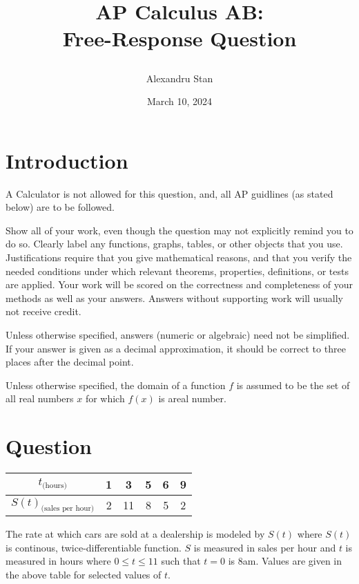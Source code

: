 \documentclass{article}
\title{
    \textbf{AP Calculus AB: \\Free-Response Question}
    \author{Alexandru Stan}
    \date{March 10, 2024}
}
\begin{document}
    \maketitle
    \vfill
    \newpage

    \section*{Introduction}

    A Calculator is not allowed for this question, and, all AP guidlines (as stated below) 
    are to be followed. 

    Show all of your work, even though the question may not explicitly remind you to do so. Clearly label any
    functions, graphs, tables, or other objects that you use. Justifications require that you give mathematical reasons,
    and that you verify the needed conditions under which relevant theorems, properties, definitions, or tests are
    applied. Your work will be scored on the correctness and completeness of your methods as well as your answers.
    Answers without supporting work will usually not receive credit.

    Unless otherwise specified, answers (numeric or algebraic) need not be simplified. If your answer is given as a
    decimal approximation, it should be correct to three places after the decimal point.

    Unless otherwise specified, the domain of a function $f$ is assumed to be the set of all real numbers $x$ for which
    $f(x)$ is areal number.

    \section*{Question}

    \begin{table}[h]
        \def\arraystretch{2}
        \begin{tabular}{|c|c|c|c|c|c|}
            \hline
            $t_{\text{(hours)}}$ & 1 & 3 & 5 & 6 & 9 \\
            \hline
            $S(t)_{\text{(sales per hour)}}$ & 2 & 11 & 8 & 5 & 2 \\
            \hline 
        \end{tabular}
    \end{table} 

    The rate at which cars are sold at a dealership is modeled by $S(t)$ where $S(t)$ is continous, twice-differentiable function.
    $S$ is measured in sales per hour and $t$ is measured in hours where $0 \le t \le 11$ such that
    $t = 0$ is 8am. Values are given in the above table for selected values of $t$.
\end{document}
